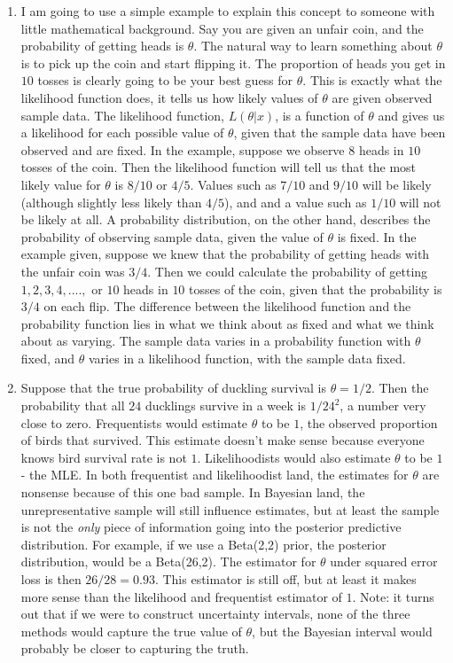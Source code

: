 \documentclass[12pt]{article}\usepackage[]{graphicx}\usepackage[]{color}
\begin{document}
\begin{doublespacing}
\begin{enumerate}
\item I am going to use a simple example to explain this concept to someone with little mathematical background. Say you are given an unfair coin, and the probability of getting heads is $\theta$. The natural way to learn something about $\theta$ is to pick up the coin and start flipping it. The proportion of heads you get in $10$ tosses is clearly going to be your best guess for $\theta$. This is exactly what the likelihood function does, it tells us how likely values of $\theta$ are given observed sample data. The likelihood function, $L(\theta|x)$, is a function of $\theta$ and gives us a likelihood for each possible value of $\theta$, given that the sample data have been observed and are fixed. In the example, suppose we observe $8$ heads in $10$ tosses of the coin. Then the likelihood function will tell us that the most likely value for $\theta$ is $8/10$ or $4/5$. Values such as $7/10$ and $9/10$ will be likely (although slightly less likely than $4/5$), and and a value such as $1/10$ will not be likely at all. A probability distribution, on the other hand, describes the probability of observing sample data, given the value of $\theta$ is fixed. In the example given, suppose we knew that the probability of getting heads with the unfair coin was $3/4$. Then we could calculate the probability of getting $1, 2, 3, 4, ....,$ or $10$ heads in $10$ tosses of the coin, given that the probability is $3/4$ on each flip. The difference between the likelihood function and the probability function lies in what we think about as fixed and what we think about as varying. The sample data varies in a probability function with $\theta$ fixed, and $\theta$ varies in a likelihood function, with the sample data fixed.

\item Suppose that the true probability of duckling survival is $\theta=1/2$. Then the probability that all $24$ ducklings survive in a week is $1/24^2$, a number very close to zero. Frequentists would estimate $\theta$ to be $1$, the observed proportion of birds that survived. This estimate doesn't make sense because everyone knows bird survival rate is not $1$. Likelihoodists would also estimate $\theta$ to be $1$ - the MLE. In both frequentist and likelihoodist land, the estimates for $\theta$ are nonsense because of this one bad sample. In Bayesian land, the unrepresentative sample will still influence estimates, but at least the sample is not the {\it only} piece of information going into the posterior predictive distribution. For example, if we use a Beta(2,2) prior, the posterior distribution, would be a Beta(26,2). The estimator for $\theta$ under squared error loss is then $26/28=0.93$. This estimator is still off, but at least it makes more sense than the likelihood and frequentist estimator of $1$. Note: it turns out that if we were to construct uncertainty intervals, none of the three methods would capture the true value of $\theta$, but the Bayesian interval would probably be closer to capturing the truth.




\end{enumerate}
\end{doublespacing}
\end{document}
